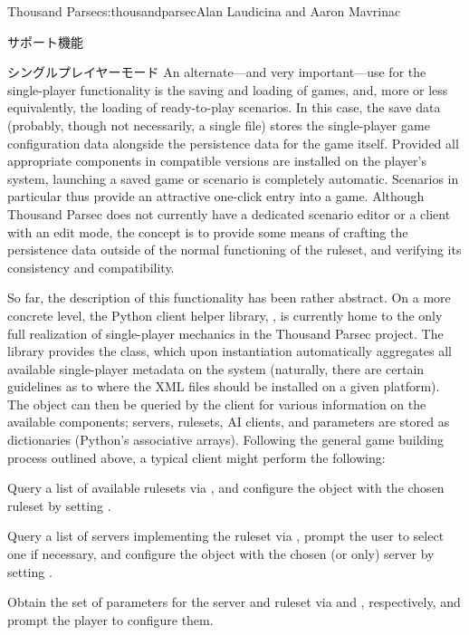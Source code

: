 \begin{aosachapter}{Thousand Parsec}{s:thousandparsec}{Alan Laudicina and Aaron Mavrinac}
\begin{aosasect1}{サポート機能}
\begin{aosasect2}{シングルプレイヤーモード}
An alternate---and very important---use for the single-player
functionality is the saving and loading of games, and, more or less
equivalently, the loading of ready-to-play scenarios. In this case,
the save data (probably, though not necessarily, a single file) stores
the single-player game configuration data alongside the persistence
data for the game itself. Provided all appropriate components in
compatible versions are installed on the player's system, launching a
saved game or scenario is completely automatic. Scenarios in
particular thus provide an attractive one-click entry into a
game. Although Thousand Parsec does not currently have a dedicated
scenario editor or a client with an edit mode, the concept is to
provide some means of crafting the persistence data outside of the
normal functioning of the ruleset, and verifying its consistency and
compatibility.

So far, the description of this functionality has been rather
abstract. On a more concrete level, the Python client helper library,
, is currently home to the only full realization
of single-player mechanics in the Thousand Parsec project. The library
provides the  class, which upon instantiation
automatically aggregates all available single-player metadata on the
system (naturally, there are certain guidelines as to where the XML
files should be installed on a given platform). The object can then be
queried by the client for various information on the available
components; servers, rulesets, AI clients, and parameters are stored
as dictionaries (Python's associative arrays). Following the general
game building process outlined above, a typical client might perform
the following:

\begin{aosaenumerate}

  \item Query a list of available rulesets via
  , and configure the object with
  the chosen ruleset by setting .

  \item Query a list of servers implementing the ruleset via
  , prompt the
  user to select one if necessary, and configure the object with the
  chosen (or only) server by setting .

  \item Obtain the set of parameters for the server and ruleset via
   and
  , respectively, and prompt
  the player to configure them.


\end{aosaenumerate}
\end{aosasect2}
\end{aosasect1}
\end{aosachapter}
